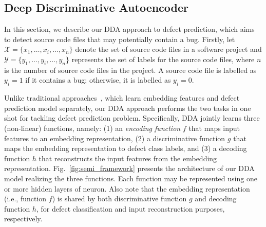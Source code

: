 \subsection{Deep Discriminative Autoencoder}
\label{sec:semi}
In this section, we describe our DDA approach to defect prediction, which aims to detect source code files that may potentially contain a bug. Firstly, let $\mathcal{X}=\{x_1, \dots, x_i, \dots, x_n\}$ denote the set of source code files in a software project and $\mathcal{Y}=\{y_1, \dots, y_i, \dots, y_n\}$ represents the set of labels for the source code files, where $n$ is the number of source code files in the project. A source code file is labelled as $y_{i}=1$ if it contains a bug; otherwise, it is labelled as $y_i = 0$. 

Unlike traditional approaches~\cite{yang2015deep, wang2016automatically}, which learn embedding features and defect prediction model separately, our DDA approach performs the two tasks in one shot for tackling defect prediction problem. Specifically, DDA jointly learns three (non-linear) functions, namely: (1) an \emph{encoding function} $f$ that maps input features to an embedding representation, (2) a discriminative function $g$ that maps the embedding representation to defect class labels, and (3) a decoding function $h$ that reconstructs the input features from the embedding representation. Fig.~\ref{fig:semi_framework} presents the architecture of our DDA model realizing the three functions. Each function may be represented using one or more hidden layers of neuron. Also note that the embedding representation (i.e., function $f$) is shared by both discriminative function $g$ and decoding function $h$, for defect classification and input reconstruction purposes, respectively.

